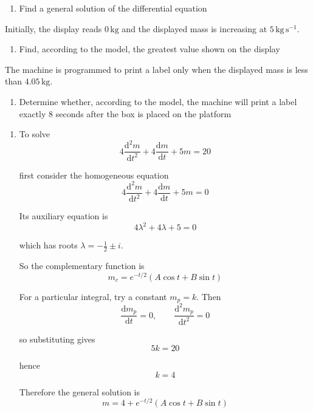 \documentclass[leqno]{article}
\begin{document}
\begin{enumerate}[
  label=\textbf{\arabic*.},
  leftmargin=*,
  topsep=0pt,
  partopsep=0pt,
  parsep=0pt
]
\begin{enumerate}[label=\textbf{(\alph*)}]
  \item Find a general solution of the differential equation  \\
\end{enumerate}
Initially, the display reads $0\,\mathrm{kg}$ and the displayed mass is increasing at $5\,\mathrm{kg\,s^{-1}}$. \\
\begin{enumerate}[label=\textbf{(\alph*)}, resume]
  \item Find, according to the model, the greatest value shown on the display  \\
\end{enumerate}
The machine is programmed to print a label only when the displayed mass is less than $4.05\,\mathrm{kg}$. \\
\begin{enumerate}[label=\textbf{(\alph*)}, resume]
  \item Determine whether, according to the model, the machine will print a label exactly $8$ seconds after the box is placed on the platform  \\
\end{enumerate}

\vspace*{10pt}

\begin{djsSolution}
\begin{enumerate}[label=\textbf{(\alph*)}]
  \item To solve
  \[
  4\frac{\mathrm{d}^2m}{\mathrm{d}t^2}+4\frac{\mathrm{d}m}{\mathrm{d}t}+5m=20
  \]

  first consider the homogeneous equation
  \[
  4\frac{\mathrm{d}^2m}{\mathrm{d}t^2}+4\frac{\mathrm{d}m}{\mathrm{d}t}+5m=0
  \]

  Its auxiliary equation is
  \[
  4\lambda^2+4\lambda+5=0
  \]

  which has roots \(\lambda=-\frac12\pm i\).

  So the complementary function is
  \[
  m_c=e^{-t/2}(A\cos t+B\sin t)
  \]

  For a particular integral, try a constant \(m_p=k\). Then
  \[
  \frac{\mathrm{d}m_p}{\mathrm{d}t}=0,\qquad \frac{\mathrm{d}^2m_p}{\mathrm{d}t^2}=0
  \]

  so substituting gives
  \[
  5k=20
  \]

  hence
  \[
  k=4
  \]

  Therefore the general solution is
  \[
  m=4+e^{-t/2}(A\cos t+B\sin t)
  \]


\end{enumerate}
\end{djsSolution}
\end{enumerate}
\end{document}
